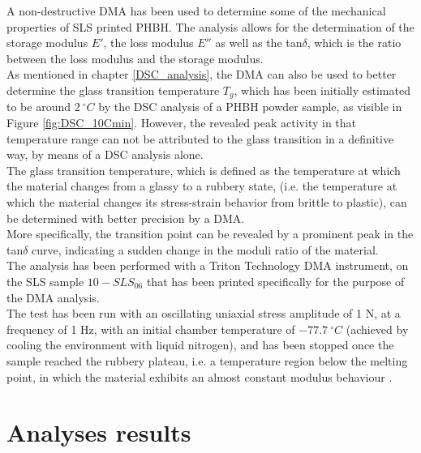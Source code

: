 \documentclass{article}
\begin{document}
        A non-destructive DMA has been used to determine some of the mechanical properties of SLS printed PHBH. The analysis 
        allows for the determination of the storage modulus $E'$, the loss modulus $E''$ as well as the tan$\delta$, 
        which is the ratio between the loss modulus and the storage modulus. \\ 

        As mentioned in chapter \ref{DSC_analysis}, the DMA can also be used to better determine the glass transition temperature $T_g$, which 
        has been initially estimated to be around $2 \ ^{\circ}C$ by the DSC analysis of a PHBH powder sample, as visible in Figure \ref{fig:DSC_10Cmin}. 
        However, the revealed 
        peak activity in that temperature range can not be attributed to the glass transition in a definitive way, by means of a DSC analysis 
        alone. \\ 

        The glass transition temperature, which is defined as the temperature at which the material changes from a glassy to a rubbery state, 
        (i.e. the temperature at which the material changes its stress-strain behavior from brittle to plastic), can be determined with 
        better precision by a DMA. \\ 

        More specifically, the transition point can be revealed by a prominent peak in the tan$\delta$ curve, indicating a 
        sudden change in the moduli ratio of the material. \\ 
        
        The analysis has been performed with a Triton Technology DMA instrument, on the SLS sample 
        $10-SLS_{06}$ that has been printed specifically for the purpose of the DMA analysis. \\ 

        The test has been run with an oscillating uniaxial stress amplitude of 1 N, at a frequency of 1 Hz, with an initial 
        chamber temperature of $- 77.7 \ ^{\circ}C$ (achieved by cooling the environment with liquid nitrogen), and has been stopped 
        once the sample reached the rubbery plateau, i.e. a temperature region below the melting point, in which the material 
        exhibits an almost constant modulus behaviour \autocites{JD_Ferry_viscoelasticpolymers}. \\

        \clearpage


      \section{Analyses results\label{analyses_results_general}}
\end{document}
